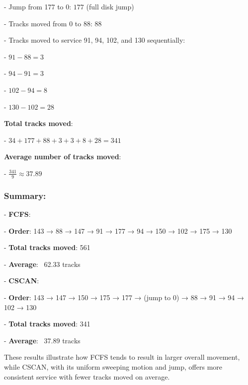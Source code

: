 \documentclass[a4paper]{book}
\begin{document}
- Jump from 177 to 0: \(177\) (full disk jump)

- Tracks moved from 0 to 88: \(88\)

- Tracks moved to service 91, 94, 102, and 130 sequentially:

  - \(91 - 88 = 3\)

  - \(94 - 91 = 3\)

  - \(102 - 94 = 8\)

  - \(130 - 102 = 28\)


\textbf{Total tracks moved}:

- \(34 + 177 + 88 + 3 + 3 + 8 + 28 = 341\)


\textbf{Average number of tracks moved}:

- \(\frac{341}{9} \approx 37.89\)


\subsubsection{\textbf{Summary}:}

- \textbf{FCFS}:

  
  - \textbf{Order}: 143 → 88 → 147 → 91 → 177 → 94 → 150 → 102 → 175 → 130

  - \textbf{Total tracks moved}: 561

  - \textbf{Average}: ~62.33 tracks


- \textbf{CSCAN}:

  
  - \textbf{Order}: 143 → 147 → 150 → 175 → 177 → (jump to 0) → 88 → 91 → 94 → 102 → 130

  - \textbf{Total tracks moved}: 341

  - \textbf{Average}: ~37.89 tracks


These results illustrate how FCFS tends to result in larger overall movement, while CSCAN, with its uniform sweeping motion and jump, offers more consistent service with fewer tracks moved on average.
\end{document}
